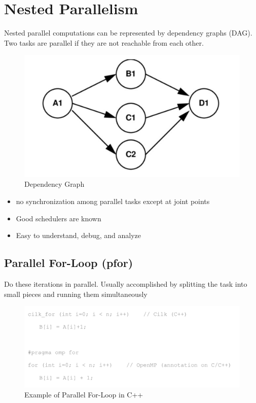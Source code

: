 \documentclass[12pt]{article}
\begin{document}
\section{Nested Parallelism}
Nested parallel computations can be represented by dependency graphs (DAG). Two tasks are parallel if they are not reachable from each other.
\begin{figure}
  \centering
  \includegraphics[scale=0.5]{dependency-graph.png}
   \caption{Dependency Graph}
\end{figure}
\begin{itemize}
    \item no synchronization among parallel tasks except at joint points
    \item Good schedulers are known
    \item Easy to understand, debug, and analyze
\end{itemize}

\subsection{Parallel For-Loop (pfor)}
Do these iterations in parallel. Usually accomplished by splitting the task into small pieces and running them simultaneously
\begin{figure}[h]
  \centering
  \includegraphics[scale=0.7]{cpp-pfor.png}
  \caption{Example of Parallel For-Loop in C++}
\end{figure}
\end{document}

